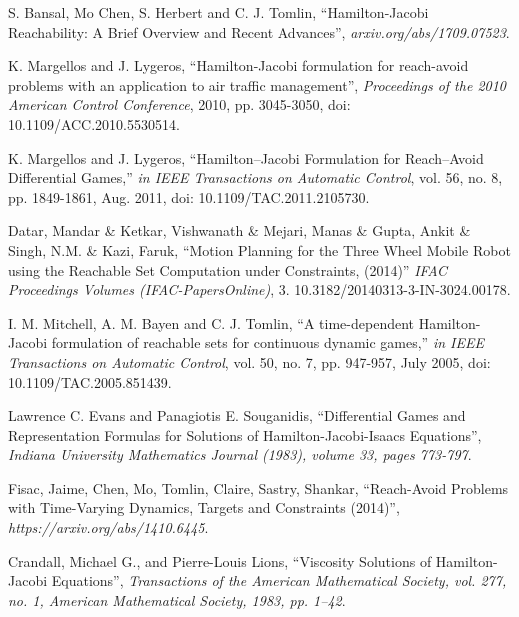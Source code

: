 \begin{thebibliography}{1}


S. Bansal, Mo Chen, S. Herbert and C. J. Tomlin, ``Hamilton-Jacobi Reachability: A Brief Overview and Recent Advances'',
\emph{arxiv.org/abs/1709.07523}.

K. Margellos and J. Lygeros, ``Hamilton-Jacobi formulation for reach-avoid problems with an application to air traffic management'',
\emph{Proceedings of the 2010 American Control Conference}, 2010, pp. 3045-3050, doi: 10.1109/ACC.2010.5530514.

K. Margellos and J. Lygeros, ``Hamilton–Jacobi Formulation for Reach–Avoid Differential Games,''
\emph{in IEEE Transactions on Automatic Control}, vol. 56, no. 8, pp. 1849-1861, Aug. 2011, doi: 10.1109/TAC.2011.2105730.

Datar, Mandar \& Ketkar, Vishwanath \& Mejari, Manas \& Gupta, Ankit \& Singh, N.M. \& Kazi, Faruk, ``Motion Planning for the Three Wheel Mobile Robot using the Reachable Set Computation under Constraints, (2014)''
\emph{IFAC Proceedings Volumes (IFAC-PapersOnline)}, 3. 10.3182/20140313-3-IN-3024.00178.

I. M. Mitchell, A. M. Bayen and C. J. Tomlin, ``A time-dependent Hamilton-Jacobi formulation of reachable sets for continuous dynamic games,''
\emph{in IEEE Transactions on Automatic Control}, vol. 50, no. 7, pp. 947-957, July 2005, doi: 10.1109/TAC.2005.851439.

Lawrence C. Evans and Panagiotis E. Souganidis, ``Differential Games and Representation Formulas for Solutions of Hamilton-Jacobi-Isaacs Equations'',
\emph{Indiana University Mathematics Journal (1983), volume 33, pages 773-797}.

Fisac, Jaime, Chen, Mo, Tomlin, Claire, Sastry, Shankar, ``Reach-Avoid Problems with Time-Varying Dynamics, Targets and Constraints (2014)'',
\emph{https://arxiv.org/abs/1410.6445}.

Crandall, Michael G., and Pierre-Louis Lions, ``Viscosity Solutions of Hamilton-Jacobi Equations'',
\emph{Transactions of the American Mathematical Society, vol. 277, no. 1, American Mathematical Society, 1983, pp. 1–42}.

\end{thebibliography}
